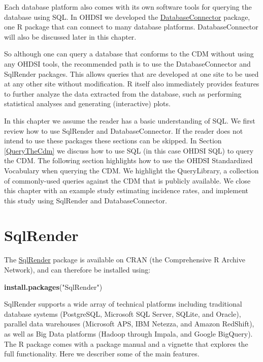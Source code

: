 \documentclass[11pt]{book}
\newenvironment{Shaded}{\begin{snugshade}}{\end{snugshade}}
\newcommand{\KeywordTok}[1]{\textcolor[rgb]{0.13,0.29,0.53}{\textbf{#1}}}
\newcommand{\StringTok}[1]{\textcolor[rgb]{0.31,0.60,0.02}{#1}}
\newcommand{\NormalTok}[1]{#1}
\theoremstyle{definition}
\theoremstyle{definition}
\theoremstyle{definition}
\theoremstyle{remark}
\begin{document}
Each database platform also comes with its own software tools for
querying the database using SQL. In OHDSI we developed the
\href{https://ohdsi.github.io/DatabaseConnector/}{DatabaseConnector}
package, one R package that can connect to many database platforms.
DatabaseConnector will also be discussed later in this chapter.

So although one can query a database that conforms to the CDM without
using any OHDSI tools, the recommended path is to use the
DatabaseConnector and SqlRender packages. This allows queries that are
developed at one site to be used at any other site without modification.
R itself also immediately provides features to further analyze the data
extracted from the database, such as performing statistical analyses and
generating (interactive) plots. 

In this chapter we assume the reader has a basic understanding of SQL.
We first review how to use SqlRender and DatabaseConnector. If the
reader does not intend to use these packages these sections can be
skipped. In Section \ref{QueryTheCdm} we discuss how to use SQL (in this
case OHDSI SQL) to query the CDM. The following section highlights how
to use the OHDSI Standardized Vocabulary when querying the CDM. We
highlight the QueryLibrary, a collection of commonly-used queries
against the CDM that is publicly available. We close this chapter with
an example study estimating incidence rates, and implement this study
using SqlRender and DatabaseConnector. 

\hypertarget{SqlRender}{\section{SqlRender}\label{SqlRender}}

The \href{https://ohdsi.github.io/SqlRender/}{SqlRender} package is
available on CRAN (the Comprehensive R Archive Network), and can
therefore be installed using:

\begin{Shaded}
\begin{Highlighting}[]
\KeywordTok{install.packages}\NormalTok{(}\StringTok{"SqlRender"}\NormalTok{)}
\end{Highlighting}
\end{Shaded}

SqlRender supports a wide array of technical platforms including
traditional database systems (PostgreSQL, Microsoft SQL Server, SQLite,
and Oracle), parallel data warehouses (Microsoft APS, IBM Netezza, and
Amazon RedShift), as well as Big Data platforms (Hadoop through Impala,
and Google BigQuery). The R package comes with a package manual and a
vignette that explores the full functionality. Here we describer some of
the main features.
\end{document}
